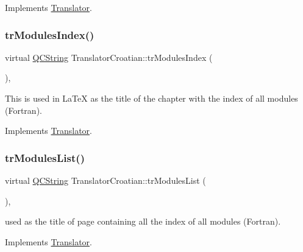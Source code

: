 Implements \mbox{\hyperlink{class_translator}{Translator}}.

\mbox{\label{class_translator_croatian_a9964e73c7bb1aceae539df16ca9de1e5}} 
\subsubsection{\texorpdfstring{trModulesIndex()}{trModulesIndex()}}
{\footnotesize\ttfamily virtual \mbox{\hyperlink{class_q_c_string}{Q\+C\+String}} Translator\+Croatian\+::tr\+Modules\+Index (\begin{DoxyParamCaption}{ }\end{DoxyParamCaption})\hspace{0.3cm}{\ttfamily [inline]}, {\ttfamily [virtual]}}

This is used in La\+TeX as the title of the chapter with the index of all modules (Fortran). 

Implements \mbox{\hyperlink{class_translator}{Translator}}.

\mbox{\label{class_translator_croatian_aa2eb500fb2597d7b76330e30ee455e74}} 
\subsubsection{\texorpdfstring{trModulesList()}{trModulesList()}}
{\footnotesize\ttfamily virtual \mbox{\hyperlink{class_q_c_string}{Q\+C\+String}} Translator\+Croatian\+::tr\+Modules\+List (\begin{DoxyParamCaption}{ }\end{DoxyParamCaption})\hspace{0.3cm}{\ttfamily [inline]}, {\ttfamily [virtual]}}

used as the title of page containing all the index of all modules (Fortran). 

Implements \mbox{\hyperlink{class_translator}{Translator}}.

\mbox{\label{class_translator_croatian_a64ef6563dc8cdbb23826799c396542b8}} 
